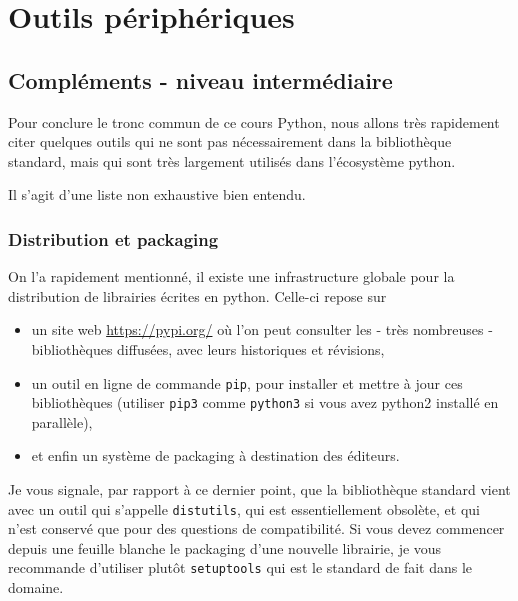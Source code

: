     
    
    
    

    

    \hypertarget{outils-puxe9riphuxe9riques}{%
\section{Outils périphériques}\label{outils-puxe9riphuxe9riques}}

    \hypertarget{compluxe9ments---niveau-intermuxe9diaire}{%
\subsection{Compléments - niveau
intermédiaire}\label{compluxe9ments---niveau-intermuxe9diaire}}

    Pour conclure le tronc commun de ce cours Python, nous allons très
rapidement citer quelques outils qui ne sont pas nécessairement dans la
bibliothèque standard, mais qui sont très largement utilisés dans
l'écosystème python.

Il s'agit d'une liste non exhaustive bien entendu.

    \hypertarget{distribution-et-packaging}{%
\subsubsection{Distribution et
packaging}\label{distribution-et-packaging}}

    On l'a rapidement mentionné, il existe une infrastructure globale pour
la distribution de librairies écrites en python. Celle-ci repose sur

\begin{itemize}
\tightlist
\item
  un site web \url{https://pypi.org/} où l'on peut consulter les - très
  nombreuses - bibliothèques diffusées, avec leurs historiques et
  révisions,
\item
  un outil en ligne de commande \texttt{pip}, pour installer et mettre à
  jour ces bibliothèques (utiliser \texttt{pip3} comme \texttt{python3}
  si vous avez python2 installé en parallèle),
\item
  et enfin un système de packaging à destination des éditeurs.
\end{itemize}

Je vous signale, par rapport à ce dernier point, que la bibliothèque
standard vient avec un outil qui s'appelle \texttt{distutils}, qui est
essentiellement obsolète, et qui n'est conservé que pour des questions
de compatibilité. Si vous devez commencer depuis une feuille blanche le
packaging d'une nouvelle librairie, je vous recommande d'utiliser plutôt
\texttt{setuptools} qui est le standard de fait dans le domaine.

